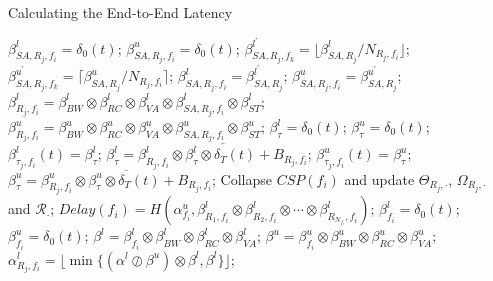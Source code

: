 \documentclass[10pt,journal]{IEEEtran}
\begin{document}
\begin{algorithm}
\caption{Calculating the End-to-End Latency}
\label{alg:equivalentservicecurve}
\begin{algorithmic}[1]
            \STATE $\beta_{SA,R_j,f_i}^l=\delta_0(t)$; $\beta_{SA,R_j,f_i}^u=\delta_0(t)$;
        \ENDFOR
    \ENDFOR
                    \STATE $\beta_{SA,R_j,f_k}^{l^\prime}=\lfloor\beta_{SA,R_j}^l/N_{R_j,f_i}\rfloor$;
                    \STATE $\beta_{SA,R_j,f_k}^{u^\prime}=\lceil\beta_{SA,R_j}^u/N_{R_j,f_i}\rceil$;
                \ENDFOR
            \ENDIF
                \STATE $\beta_{SA,R_j,f_i}^l=\beta_{SA,R_j}^{l^\prime}$; $\beta_{SA,R_j,f_i}^u=\beta_{SA,R_j}^{u^\prime}$;
            \ENDIF
            \STATE $\beta_{R_j,f_i}^l=\beta_{BW}^l\otimes\beta_{RC}^l\otimes\beta_{VA}^l\otimes\beta_{SA,R_j,f_i}^l\otimes \beta_{ST}^l$;
            \STATE $\beta_{R_j,f_i}^u=\beta_{BW}^u\otimes\beta_{RC}^u\otimes\beta_{VA}^u\otimes\beta_{SA,R_j,f_i}^u\otimes \beta_{ST}^u$;
        \ENDFOR
        \STATE $\beta_{\tau}^l=\delta_0(t)$; $\beta_{\tau}^u=\delta_0(t)$;
            \STATE $\beta^{l}_{\tau_j,f_i}(t)=\beta_{\tau}^l$; $\beta_{\tau}^l=\overline{\beta^l_{R_j,f_i}\otimes\beta^{l}_{\tau}\otimes\delta_T(t)+B_{R_j,f_i}}$;
            \STATE $\beta^{u}_{\tau_j,f_i}(t)=\beta_{\tau}^u$; $\beta_{\tau}^u=\overline{\beta^u_{R_j,f_i}\otimes\beta^{u}_{\tau}\otimes\delta_T(t)+B_{R_j,f_i}}$;
        \ENDFOR
        \STATE Collapse $CSP(f_i)$ and update $\Theta_{R_j,\cdot}$, $\Omega_{R_j,\cdot}$ and $\mathcal{R}_{\cdot}$;
        \STATE $Delay(f_i)=H(\alpha^u_{f_i},\beta^l_{R_1,f_i}\otimes\beta^l_{R_2,f_i}\otimes\cdots\otimes\beta^l_{R_{N_{f_i}},f_i})$;
        \STATE $\beta_{f_i}^l=\delta_0(t)$; $\beta_{f_i}^u=\delta_0(t)$;
            \STATE $\beta^l=\beta^l_{f_i}\otimes\beta_{BW}^l\otimes\beta_{RC}^l\otimes\beta_{VA}^l$;
            \STATE $\beta^u=\beta^u_{f_i}\otimes\beta_{BW}^u\otimes\beta_{RC}^u\otimes\beta_{VA}^u$;
            \STATE $\alpha^l_{R_j,f_i}=\lfloor\min\{(\alpha^l\oslash\beta^u)\otimes\beta^l,\beta^l\}\rfloor$;

\end{algorithmic}
\end{algorithm}
\end{document}

